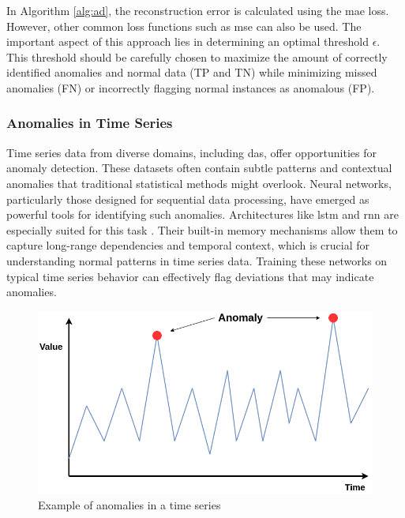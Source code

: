 In Algorithm \ref{alg:ad}, the reconstruction error is calculated using the \acrshort{mae} loss. However, other common loss functions such as \acrshort{mse} can also be used. The important aspect of this approach lies in determining an optimal threshold $\epsilon$. This threshold should be carefully chosen to maximize the amount of correctly identified anomalies and normal data (TP and TN) while minimizing missed anomalies (FN) or incorrectly flagging normal instances as anomalous (FP).


\subsubsection{Anomalies in Time Series}

Time series data from diverse domains, including \acrshort{das}, offer opportunities for anomaly detection. These datasets often contain subtle patterns and contextual anomalies that traditional statistical methods might overlook. Neural networks, particularly those designed for sequential data processing, have emerged as powerful tools for identifying such anomalies. Architectures like \acrfull{lstm} \cite{lstm} and \acrfull{rnn} \cite{medsker2001recurrent} are especially suited for this task \cite{wang2024deep, wei2022lstmautoencoder}. Their built-in memory mechanisms allow them to capture long-range dependencies and temporal context, which is crucial for understanding normal patterns in time series data. Training these networks on typical time series behavior can effectively flag deviations that may indicate anomalies. 

\begin{figure}[!h]
    \centering
    \includegraphics[scale=0.4]{figures/anolay_line.png}
    \caption{Example of anomalies in a time series}
    \label{fig:anomaly_example}
\end{figure}


